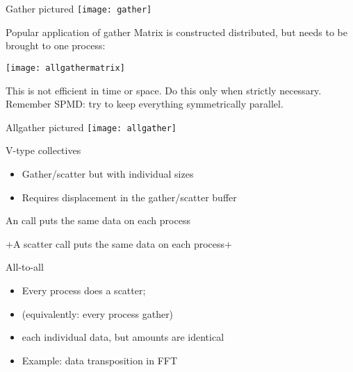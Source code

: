 \begin{numberedframe}{Gather pictured}
  \texttt{[image: gather]}
\end{numberedframe}

\begin{numberedframe}{Popular application of gather}
  Matrix is constructed distributed, but needs to be brought to one
  process:
  
  \texttt{[image: allgathermatrix]}

  This is not efficient in time or space. Do this
  only when strictly necessary. Remember SPMD: try to keep everything
  symmetrically parallel. 
\end{numberedframe}

\begin{mpl}
  \addtocounter{slidecount}{-1}
\end{mpl}

\begin{numberedframe}{Allgather pictured}
  \texttt{[image: allgather]}
\end{numberedframe}

\begin{numberedframe}{V-type collectives}
  \begin{itemize}
  \item Gather/scatter but with individual sizes
  \item Requires displacement in the gather/scatter buffer
  \end{itemize}
\end{numberedframe}

\begin{mpl}
  \addtocounter{slidecount}{-1}
\end{mpl}

\begin{exerciseframe}[scangather]
  
\end{exerciseframe}

\begin{reviewframe}
  An  call puts the same data on each process
  
  \slackpollTF+A scatter call puts the same data on each process+
\end{reviewframe}

\begin{numberedframe}{All-to-all}
  \begin{itemize}
  \item Every process does a scatter;
  \item (equivalently: every process gather)
  \item each individual data, but amounts are identical
  \item Example: data transposition in FFT
  \end{itemize}
\end{numberedframe}

